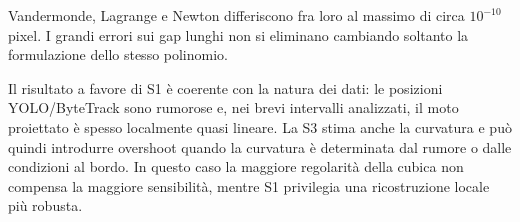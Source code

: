 \documentclass[11pt,a4paper]{article}
\numberwithin{equation}{section}
\begin{document}
\begin{table}[htbp]
\centering
\caption{RMS in pixel per tutti i gap del benchmark, con otto nodi visibili.}
\scriptsize
{}
\end{table}

Vandermonde, Lagrange e Newton differiscono fra loro al massimo di circa
$10^{-10}$ pixel. I grandi errori sui gap lunghi non si eliminano
cambiando soltanto la formulazione dello stesso polinomio.

Il risultato a favore di S1 è coerente con la natura dei dati: le posizioni
YOLO/ByteTrack sono rumorose e, nei brevi intervalli analizzati, il moto
proiettato è spesso localmente quasi lineare. La S3 stima anche la curvatura
e può quindi introdurre overshoot quando la curvatura è determinata dal
rumore o dalle condizioni al bordo. In questo caso la maggiore regolarità
della cubica non compensa la maggiore sensibilità, mentre S1 privilegia una
ricostruzione locale più robusta.
\end{document}
